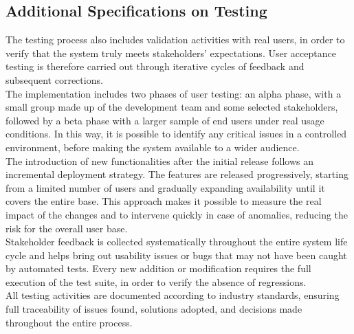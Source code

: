 \subsection{Additional Specifications on Testing}
The testing process also includes validation activities with real users, in order to verify that the system truly meets stakeholders’ expectations. User acceptance testing is therefore carried out through iterative cycles of feedback and subsequent corrections. \\
The implementation includes two phases of user testing: an alpha phase, with a small group made up of the development team and some selected stakeholders, followed by a beta phase with a larger sample of end users under real usage conditions. In this way, it is possible to identify any critical issues in a controlled environment, before making the system available to a wider audience. \\
The introduction of new functionalities after the initial release follows an incremental deployment strategy. The features are released progressively, starting from a limited number of users and gradually expanding availability until it covers the entire base. This approach makes it possible to measure the real impact of the changes and to intervene quickly in case of anomalies, reducing the risk for the overall user base. \\
Stakeholder feedback is collected systematically throughout the entire system life cycle and helps bring out usability issues or bugs that may not have been caught by automated tests. Every new addition or modification requires the full execution of the test suite, in order to verify the absence of regressions. \\
All testing activities are documented according to industry standards, ensuring full traceability of issues found, solutions adopted, and decisions made throughout the entire process.